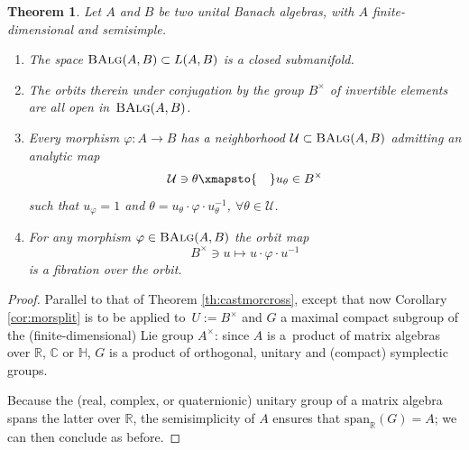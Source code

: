 \documentclass[10pt,a4paper]{amsart}
\numberwithin{equation}{section}
\newtheorem{Theorem}{Theorem}[section]
\newcommand\bC{{\mathbb C}}
\newcommand\bH{{\mathbb H}}
\newcommand\bR{{\mathbb R}}
\newcommand\cU{{\mathcal U}}
\newcommand{\cat}[1]{\text{\sc #1}}
\begin{document}
\begin{Theorem}\label{th:banmorcross}
 Let $A$ and $B$ be two unital Banach algebras, with $A$ finite-dimensional and semisimple.
 \begin{enumerate}[$(1)$]\itemsep=0pt
 \item\label{item:banisman} The space $\cat{BAlg}(A,B)\subset L(A,B)$ is a closed submanifold.

 \item\label{item:banopenorb} The orbits therein under conjugation by the group $B^{\times}$ of invertible elements are all open in~$\cat{BAlg}(A,B)$.

 \item\label{item:bansect} Every morphism $\varphi\colon A\to B$ has a neighborhood $\cU\subset \cat{BAlg}(A,B)$ admitting an analytic map
 \begin{equation*}
 \cU\ni \theta\xmapsto{\quad}u_{\theta}\in B^{\times}
 \end{equation*}
 such that $u_{\varphi}=1$ and $\theta = u_{\theta}\cdot \varphi\cdot u_{\theta}^{-1}$, $\forall \theta\in \cU$.

 \item\label{item:banfib} For any morphism $\varphi\in \cat{BAlg}(A,B)$ the orbit map
 \begin{equation*}
 B^{\times}\ni u\mapsto u\cdot \varphi\cdot u^{-1}
 \end{equation*}
 is a fibration over the orbit.



 \end{enumerate}
\end{Theorem}
\begin{proof}
 Parallel to that of Theorem \ref{th:castmorcross}, except that now Corollary \ref{cor:morsplit} is to be applied to~${U\!:=\!B^{\times}}$ and $G$ a maximal compact subgroup of the (finite-dimensional) Lie group $A^{\times}$: since $A$ is a~product of matrix algebras over $\bR$, $\bC$ or $\bH$, $G$ is a product of orthogonal, unitary and (compact) symplectic \cite[Exercise 7.4 and discussion preceding it]{fh} groups.

 Because the (real, complex, or quaternionic) unitary group of a matrix algebra spans the latter over $\bR$, the semisimplicity of $A$ ensures that $\mathrm{span}_{\bR}(G)=A$;
 we can then conclude as before.
\end{proof}
\end{document}
